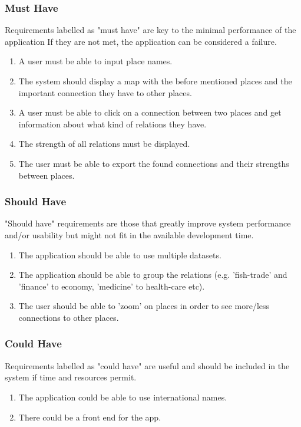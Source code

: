 \subsubsection {Must Have}
Requirements labelled as "must have" are key to the minimal performance of the application If they are not met, the application can be considered a failure.

\begin{enumerate}
    \item A user must be able to input place names.
    \item The system should display a map with the before mentioned places and the important connection they have to other places.
    \item A user must be able to click on a connection between two places and get information about what kind of relations they have.
    \item The strength of all relations must be displayed.
    \item The user must be able to export the found connections and their strengths between places.
\end{enumerate}
 
\subsubsection {Should Have}
"Should have" requirements are those that greatly improve system performance and/or usability but might not fit in the available development time.

\begin{enumerate}
    \item The application should be able to use multiple datasets.
    \item The application should be able to group the relations (e.g. 'fish-trade' and 'finance' to economy, 'medicine' to health-care etc).
    \item The user should be able to 'zoom' on places in order to see more/less connections to other places.
\end{enumerate}

\subsubsection {Could Have}
Requirements labelled as "could have" are useful and should be included in the system if time and resources permit.

\begin{enumerate}
    \item The application could be able to use international names.
    \item There could be a front end for the app.
\end{enumerate}

